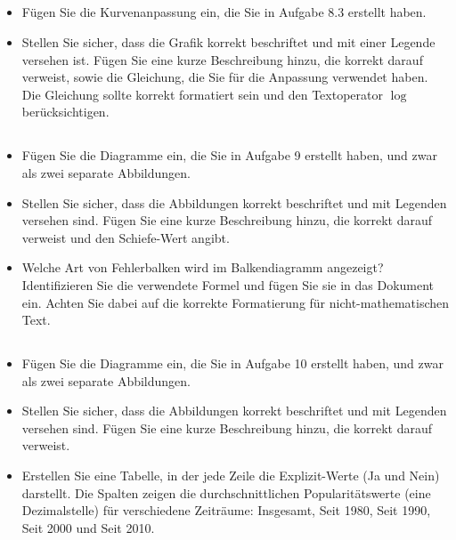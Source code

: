 \documentclass[
	german,
	accentcolor=9c,%
	type=intern,
	marginpar=false
	]{tudapub}
\begin{document}
\subsection{}
\begin{itemize}
\item Fügen Sie die Kurvenanpassung ein, die Sie in Aufgabe 8.3 erstellt haben. 
\item Stellen Sie sicher, dass die Grafik korrekt beschriftet und mit einer Legende versehen ist. Fügen Sie eine kurze Beschreibung hinzu, die korrekt darauf verweist, sowie die Gleichung, die Sie für die Anpassung verwendet haben. Die Gleichung sollte korrekt formatiert sein und den Textoperator $\log$ berücksichtigen.
\end{itemize}

\subsection{}
\begin{itemize}
\item Fügen Sie die Diagramme ein, die Sie in Aufgabe 9 erstellt haben, und zwar als zwei separate Abbildungen. 
\item Stellen Sie sicher, dass die Abbildungen korrekt beschriftet und mit Legenden versehen sind. Fügen Sie eine kurze Beschreibung hinzu, die korrekt darauf verweist und den Schiefe-Wert angibt.
\item Welche Art von Fehlerbalken wird im Balkendiagramm angezeigt? Identifizieren Sie die verwendete Formel und fügen Sie sie in das Dokument ein. Achten Sie dabei auf die korrekte Formatierung für nicht-mathematischen Text.
\end{itemize}

\subsection{}
\begin{itemize}
\item Fügen Sie die Diagramme ein, die Sie in Aufgabe 10 erstellt haben, und zwar als zwei separate Abbildungen. 
\item Stellen Sie sicher, dass die Abbildungen korrekt beschriftet und mit Legenden versehen sind. Fügen Sie eine kurze Beschreibung hinzu, die korrekt darauf verweist.
\item Erstellen Sie eine Tabelle, in der jede Zeile die Explizit-Werte (Ja und Nein) darstellt. Die Spalten zeigen die durchschnittlichen Popularitätswerte (eine Dezimalstelle) für verschiedene Zeiträume: Insgesamt, Seit 1980, Seit 1990, Seit 2000 und Seit 2010.
\end{itemize}
\end{document}
